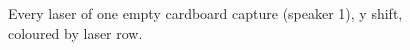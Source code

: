 \begin{figure}[t]
\centering

\caption{Every laser of one empty cardboard capture (speaker 1), y shift, coloured by laser row.}
\label{fig:lasers_one_capture_y}
\end{figure}
